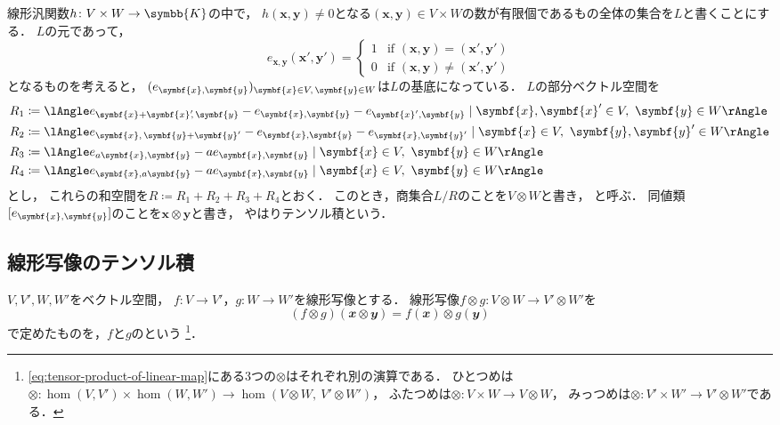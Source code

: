 \documentclass[../sotsu.tex]{subfiles}
\begin{document}
\begin{definition}
    \label{dfn:tensor-product}
    線形汎関数$h \colon V \times W \to \symbb{K}$の中で，
    $h(\symbf{x}, \symbf{y}) \neq 0$となる$(\symbf{x}, \symbf{y}) \in V \times W$の数が有限個であるもの全体の集合を$L$と書くことにする．
    $L$の元であって，
    \begin{equation*}
        e_{\symbf{x}, \symbf{y}} (\symbf{x}', \symbf{y}') = 
        \begin{cases}
            1  &  \text{if } (\symbf{x}, \symbf{y}) = (\symbf{x}', \symbf{y}')  \\
            0  &  \text{if } (\symbf{x}, \symbf{y}) \neq (\symbf{x}', \symbf{y}')
        \end{cases}
    \end{equation*}
    となるものを考えると，
    $\sequ{e_{\symbf{x}, \symbf{y}}}[\symbf{x} \in V, \, \symbf{y} \in W]$は$L$の基底になっている．
    $L$の部分ベクトル空間を
    \begin{align*}
        R_1 &\coloneq \spanning{ e_{\symbf{x} + \symbf{x}^{\mathrlap{\prime}}, \, \symbf{y}} - e_{\symbf{x}, \symbf{y}} - e_{\symbf{x}', \symbf{y}} \mid \symbf{x}, \symbf{x}' \in V, \  \symbf{y} \in W }  \\
        R_2 &\coloneq \spanning{ e_{\symbf{x}, \, \symbf{y} + \symbf{y}'} - e_{\symbf{x}, \symbf{y}} - e_{\symbf{x}, \symbf{y}'} \mid \symbf{x} \in V, \  \symbf{y}, \symbf{y}' \in W }  \\
        R_3 &\coloneq \spanning{ e_{a\symbf{x}, \symbf{y}} - a e_{\symbf{x}, \symbf{y}} \mid \symbf{x} \in V, \  \symbf{y} \in W }  \\
        R_4 &\coloneq \spanning{ e_{\symbf{x}, a\symbf{y}} - a e_{\symbf{x}, \symbf{y}} \mid \symbf{x} \in V, \  \symbf{y} \in W }
    \end{align*}
    とし，
    これらの和空間を$R \coloneq R_1 + R_2 + R_3 + R_4$とおく．
    このとき，商集合$L/R$のことを$V \otimes W$と書き，
    と呼ぶ．
    同値類$\eqclass{e_{\symbf{x}, \symbf{y}}}$のことを$\symbf{x} \otimes \symbf{y}$と書き，
    やはりテンソル積という．
\end{definition}


\subsection{線形写像のテンソル積}
\label{sec:tensor-product-of-linear-map}

$V, V', W, W'$をベクトル空間，
$f \colon V \to V'$，$g \colon W \to W'$を線形写像とする．
線形写像$f \otimes g \colon V \otimes W \to V' \otimes W'$を
\begin{equation}
    \label{eq:tensor-product-of-linear-map}
    (f \otimes g)(𝒙 \otimes 𝒚)
        = f(𝒙) \otimes g(𝒚)
\end{equation}
で定めたものを，$f$と$g$のという%
\footnote{
    \cref{eq:tensor-product-of-linear-map}にある3つの$\otimes$はそれぞれ別の演算である．
    ひとつめは$\otimes \colon \hom(V, V') \times \hom(W, W') \to \hom ( V \otimes W, \  V' \otimes W' )$，
    ふたつめは$\otimes \colon V \times W \to V \otimes W$，
    みっつめは$\otimes \colon V' \times W' \to V' \otimes W'$である．
}．
\end{document}
